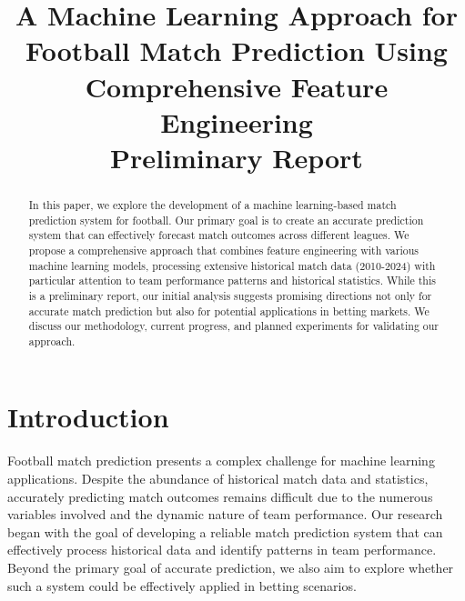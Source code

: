 \documentclass[conference]{IEEEtran}
\begin{document}
\title{A Machine Learning Approach for Football Match Prediction Using Comprehensive Feature Engineering\\
\large{Preliminary Report}}

\author{
}

\maketitle

\begin{abstract}
In this paper, we explore the development of a machine learning-based match prediction system for football. Our primary goal is to create an accurate prediction system that can effectively forecast match outcomes across different leagues. We propose a comprehensive approach that combines feature engineering with various machine learning models, processing extensive historical match data (2010-2024) with particular attention to team performance patterns and historical statistics. While this is a preliminary report, our initial analysis suggests promising directions not only for accurate match prediction but also for potential applications in betting markets. We discuss our methodology, current progress, and planned experiments for validating our approach.
\end{abstract}

\section{Introduction}
Football match prediction presents a complex challenge for machine learning applications. Despite the abundance of historical match data and statistics, accurately predicting match outcomes remains difficult due to the numerous variables involved and the dynamic nature of team performance. Our research began with the goal of developing a reliable match prediction system that can effectively process historical data and identify patterns in team performance. Beyond the primary goal of accurate prediction, we also aim to explore whether such a system could be effectively applied in betting scenarios.
\end{document}
